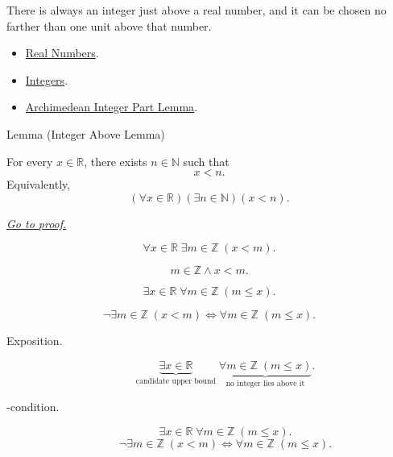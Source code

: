 \begin{remark*}[Interpretation]
There is always an integer just above a real number, and it can be chosen no
farther than one unit above that number.
\end{remark*}

\begin{dependencies}
\begin{itemize}
\item \hyperref[def:reals]{Real Numbers}.
\item \hyperref[def:integers]{Integers}.
\item \hyperref[lem:archimedean-integer-part-lemma]{Archimedean Integer Part Lemma}.
\end{itemize}
\end{dependencies}



\begin{lemmabox}{Lemma (Integer Above Lemma)}
\begin{lemma}
\label{lem:integer-above-lemma}
For every $x\in\mathbb{R}$, there exists $n\in\mathbb{N}$ such that
\[
  x<n.
\]
Equivalently,
\[
  (\forall x\in\mathbb{R})(\exists n\in\mathbb{N})(x<n).
\]

\smallskip
\noindent
\hyperref[prf:integer-above-lemma]{\textit{Go to proof.}}
\end{lemma}
\end{lemmabox}

\begin{remark*}
\[
\forall x\in\mathbb{R}\;\exists m\in\mathbb{Z}\;(x<m).
\]
\end{remark*}

\begin{remark*}
\[
m\in\mathbb{Z}\land x<m.
\]
\end{remark*}

\begin{remark*}
\[
\exists x\in\mathbb{R}\;\forall m\in\mathbb{Z}\;(m\le x).
\]
\end{remark*}

\begin{remark*}
\[
\neg\exists m\in\mathbb{Z}\;(x<m)
\Longleftrightarrow
\forall m\in\mathbb{Z}\;(m\le x).
\]
\end{remark*}

\begin{remark*}
\begin{description}
  \item[Exposition.]
\[
\underbrace{\exists x\in\mathbb{R}}_{\text{candidate upper bound}}
\;\underbrace{\forall m\in\mathbb{Z}\;(m\le x)}_{\text{no integer lies above it}}.
\]


  \item[\exists-condition.]
  \[
\exists x\in\mathbb{R}\;\forall m\in\mathbb{Z}\;(m\le x).
\]
\[
\neg\exists m\in\mathbb{Z}\;(x<m)
\Longleftrightarrow
\forall m\in\mathbb{Z}\;(m\le x).
\]
\end{description}
\end{remark*}

